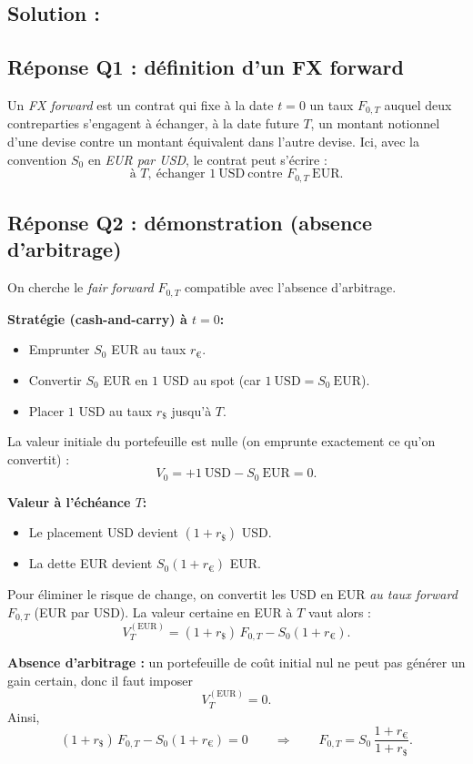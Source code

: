 \subsection*{Solution :}

\subsection*{Réponse Q1 : définition d'un FX forward}
Un \emph{FX forward} est un contrat qui fixe à la date $t=0$ un taux $F_{0,T}$ auquel deux contreparties
s'engagent à échanger, à la date future $T$, un montant notionnel d'une devise contre un montant équivalent
dans l'autre devise.
Ici, avec la convention $S_0$ en \emph{EUR par USD}, le contrat peut s'écrire :
\[
\text{à } T,\ \text{échanger } 1~\mathrm{USD} \ \text{contre } F_{0,T}~\mathrm{EUR}.
\]

\subsection*{Réponse Q2 : démonstration (absence d'arbitrage)}
On cherche le \emph{fair forward} $F_{0,T}$ compatible avec l'absence d'arbitrage.

\medskip
\noindent\textbf{Stratégie (cash-and-carry) à $t=0$:}
\begin{itemize}
  \item Emprunter $S_0$ EUR au taux $r_{\euro}$.
  \item Convertir $S_0$ EUR en $1$ USD au spot (car $1~\mathrm{USD}=S_0~\mathrm{EUR}$).
  \item Placer $1$ USD au taux $r_{\$}$ jusqu'à $T$.
\end{itemize}
La valeur initiale du portefeuille est nulle (on emprunte exactement ce qu'on convertit) :
\[
V_0 = +1~\mathrm{USD} - S_0~\mathrm{EUR} = 0.
\]

\medskip
\noindent\textbf{Valeur à l'échéance $T$:}
\begin{itemize}
  \item Le placement USD devient $(1+r_{\$})$ USD.
  \item La dette EUR devient $S_0(1+r_{\euro})$ EUR.
\end{itemize}

Pour éliminer le risque de change, on convertit les USD en EUR \emph{au taux forward} $F_{0,T}$ (EUR par USD).
La valeur certaine en EUR à $T$ vaut alors :
\[
V_T^{(\mathrm{EUR})} = (1+r_{\$})\,F_{0,T} - S_0(1+r_{\euro}).
\]

\medskip
\noindent\textbf{Absence d'arbitrage :} un portefeuille de coût initial nul ne peut pas générer un gain certain,
donc il faut imposer
\[
V_T^{(\mathrm{EUR})}=0.
\]
Ainsi,
\[
(1+r_{\$})\,F_{0,T} - S_0(1+r_{\euro}) = 0
\qquad\Longrightarrow\qquad
\boxed{
F_{0,T} = S_0\,\frac{1+r_{\euro}}{1+r_{\$}} }.
\]

